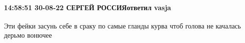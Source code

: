  
 
 
 
 

\paragraph{14:58:51 30-08-22 СЕРГЕЙ РОССИЯответил vasja}

Эти фейки засунь себе в сраку по самые гланды курва чтоб голова не качалась
дерьмо вонючее
